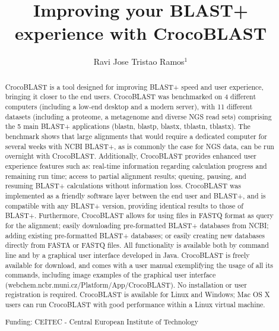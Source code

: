 \documentclass[twoside]{article}
\title{\vspace{-15mm}\fontsize{24pt}{10pt}\selectfont\textbf{Improving your BLAST+ experience with CrocoBLAST}} %
\author{Ravi Jose Tristao Ramos$^1$}
\affil{1 CEITEC - CENTRAL EUROPEAN INSTITUTE OF TECHNOLOGY\\ }
\date{}
\begin{document}
\maketitle %

\thispagestyle{fancy} %


\begin{abstract}
CrocoBLAST is a tool designed for improving BLAST+ speed and user experience, bringing it closer to the end users. CrocoBLAST was benchmarked on 4 different computers (including a low-end desktop and a modern server), with 11 different datasets (including a proteome, a metagenome and diverse NGS read sets) comprising the 5 main BLAST+ applications (blastn, blastp, blastx, tblastn, tblastx). The benchmark shows that large alignments that would require a dedicated computer for several weeks with NCBI BLAST+, as is commonly the case for NGS data, can be run overnight with CrocoBLAST. Additionally, CrocoBLAST provides enhanced user experience features such as: real-time information regarding calculation progress and remaining run time; access to partial alignment results; queuing, pausing, and resuming BLAST+ calculations without information loss. CrocoBLAST was implemented as a friendly software layer between the end user and BLAST+, and is compatible with any BLAST+ version, providing identical results to those of BLAST+. Furthermore, CrocoBLAST allows for using files in FASTQ format as query for the alignment; easily downloading pre-formatted BLAST+ databases from NCBI; adding existing pre-formatted BLAST+ databases; or easily creating new databases directly from FASTA or FASTQ files. All functionality is available both by command line and by a graphical user interface developed in Java. CrocoBLAST is freely available for download, and comes with a user manual exemplifying the usage of all its commands, including image examples of the graphical user interface (webchem.ncbr.muni.cz/Platform/App/CrocoBLAST). No installation or user registration is required. CrocoBLAST is available for Linux and Windows; Mac OS X users can run CrocoBLAST with good performance within a Linux virtual machine.

Funding: CEITEC - Central European Institute of Technology
\end{abstract}
\end{document}
